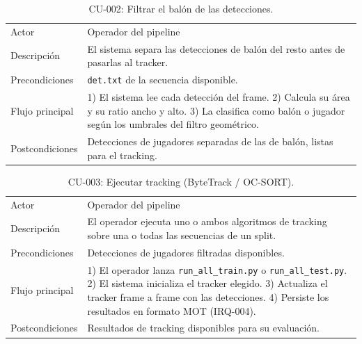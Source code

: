 \begin{table}[htp]
\centering
\caption{CU-002: Filtrar el balón de las detecciones.}
\label{tab:cu-002}
\renewcommand{\arraystretch}{1.2}
\begin{tabular}{|p{3.1cm}|p{9.2cm}|}
\hline
\rowcolor{gray!25}
\multicolumn{2}{|l|}{\textbf{CU-002 -- Filtrar el balón de las detecciones}} \\
\hline
Actor & Operador del pipeline \\
\hline
Descripción & El sistema separa las detecciones de balón del resto antes de
  pasarlas al tracker. \\
\hline
Precondiciones & \texttt{det.txt} de la secuencia disponible. \\
\hline
Flujo principal & 1) El sistema lee cada detección del frame. 2) Calcula su
  área y su ratio ancho y alto. 3) La clasifica como balón o jugador según
  los umbrales del filtro geométrico. \\
\hline
Postcondiciones & Detecciones de jugadores separadas de las de balón, listas
  para el tracking. \\
\hline
\end{tabular}
\end{table}

\begin{table}[htp]
\centering
\caption{CU-003: Ejecutar tracking (ByteTrack / OC-SORT).}
\label{tab:cu-003}
\renewcommand{\arraystretch}{1.2}
\begin{tabular}{|p{3.1cm}|p{9.2cm}|}
\hline
\rowcolor{gray!25}
\multicolumn{2}{|l|}{\textbf{CU-003 -- Ejecutar tracking}} \\
\hline
Actor & Operador del pipeline \\
\hline
Descripción & El operador ejecuta uno o ambos algoritmos de tracking sobre
  una o todas las secuencias de un split. \\
\hline
Precondiciones & Detecciones de jugadores filtradas disponibles. \\
\hline
Flujo principal & 1) El operador lanza \texttt{run\_all\_train.py} o
  \texttt{run\_all\_test.py}. 2) El sistema inicializa el tracker
  elegido. 3) Actualiza el tracker frame a frame con las detecciones. 4)
  Persiste los resultados en formato MOT (IRQ-004). \\
\hline
Postcondiciones & Resultados de tracking disponibles para su evaluación. \\
\hline
\end{tabular}
\end{table}


